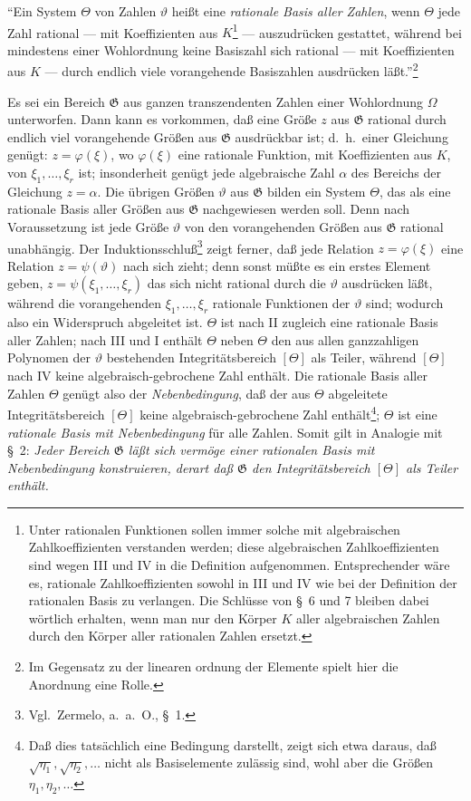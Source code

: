 \documentclass[12pt,a4paper]{article}
\begin{document}
``Ein System $\Theta$ von Zahlen $\vartheta$ hei\ss t eine \emph{rationale Basis aller Zahlen}, wenn $\Theta$ jede Zahl rational --- mit Koeffizienten aus $K$\footnote{Unter rationalen Funktionen sollen immer solche mit algebraischen Zahlkoeffizienten verstanden werden; diese algebraischen Zahlkoeffizienten sind wegen III und IV in die Definition aufgenommen. Entsprechender w\"are es, rationale Zahlkoeffizienten sowohl in III und IV wie bei der Definition der rationalen Basis zu verlangen. Die Schl\"usse von \S\ 6 und 7 bleiben dabei w\"ortlich erhalten, wenn man nur den K\"orper $K$ aller algebraischen Zahlen durch den K\"orper aller rationalen Zahlen ersetzt.} --- auszudr\"ucken gestattet, w\"ahrend bei mindestens einer Wohlordnung keine Basiszahl sich rational --- mit Koeffizienten aus $K$ --- durch endlich viele vorangehende Basiszahlen ausdr\"ucken l\"a\ss t.''\footnote{Im Gegensatz zu der linearen ordnung der Elemente spielt hier die Anordnung eine Rolle.}

Es sei ein Bereich $\mathfrak{G}$ aus ganzen transzendenten Zahlen einer Wohlordnung $\Omega$ unterworfen. Dann kann es vorkommen, da\ss{} eine Gr\"o\ss e $z$ aus $\mathfrak{G}$ rational durch endlich viel vorangehende Gr\"o\ss en aus $\mathfrak{G}$ ausdr\"uckbar ist; d.\ h.\ einer Gleichung gen\"ugt: $z = \varphi(\xi)$, wo $\varphi(\xi)$ eine rationale Funktion, mit Koeffizienten aus $K$, von $\xi_1, \ldots, \xi_r$ ist; insonderheit gen\"ugt jede algebraische Zahl $\alpha$ des Bereichs der Gleichung $z = \alpha$. Die \"ubrigen Gr\"o\ss en $\vartheta$ aus $\mathfrak{G}$ bilden ein System $\Theta$, das als eine rationale Basis aller Gr\"o\ss en aus $\mathfrak{G}$ nachgewiesen werden soll. Denn nach Voraussetzung ist jede Gr\"o\ss e $\vartheta$ von den vorangehenden Gr\"o\ss en aus $\mathfrak{G}$ rational unabh\"angig. Der Induktionsschlu\ss{}\footnote{Vgl.\ Zermelo, a.\ a.\ O., \S\ 1.} zeigt ferner, da\ss{} jede Relation $z = \varphi(\xi)$ eine Relation $z = \psi(\vartheta)$ nach sich zieht; denn sonst m\"u\ss te es ein erstes Element geben, $z = \psi(\xi_1, \ldots, \xi_r)$ das sich nicht rational durch die $\vartheta$ ausdr\"ucken l\"a\ss t, w\"ahrend die vorangehenden $\xi_1, \ldots, \xi_r$ rationale Funktionen der $\vartheta$ sind; wodurch also ein Widerspruch abgeleitet ist. $\Theta$ ist nach II zugleich eine rationale Basis aller Zahlen; nach III und I enth\"alt $\Theta$ neben $\Theta$ den aus allen ganzzahligen Polynomen der $\vartheta$ bestehenden Integrit\"atsbereich $[\Theta]$ als Teiler, w\"ahrend $[\Theta]$ nach IV keine algebraisch-gebrochene Zahl enth\"alt. Die rationale Basis aller Zahlen $\Theta$ gen\"ugt also der \emph{Nebenbedingung}, da\ss{} der aus $\Theta$ abgeleitete Integrit\"atsbereich $[\Theta]$ keine algebraisch-gebrochene Zahl enth\"alt\footnote{Da\ss{} dies tats\"achlich eine Bedingung darstellt, zeigt sich etwa daraus, da\ss{} $\sqrt{\eta_1}, \sqrt{\eta_2}, \ldots$ nicht als Basiselemente zul\"assig sind, wohl aber die Gr\"o\ss en $\eta_1, \eta_2, \ldots$}; $\Theta$ ist eine \emph{rationale Basis mit Nebenbedingung} f\"ur alle Zahlen. Somit gilt in Analogie mit \S\ 2: \emph{Jeder Bereich $\mathfrak{G}$ l\"a\ss t sich verm\"oge einer rationalen Basis mit Nebenbedingung konstruieren, derart da\ss{} $\mathfrak{G}$ den Integrit\"atsbereich $[\Theta]$ als Teiler enth\"alt.}
\end{document}
